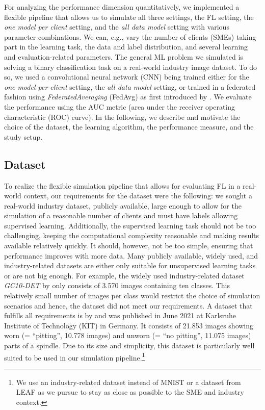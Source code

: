 For analyzing the performance dimension quantitatively, we implemented a flexible pipeline that allows us to simulate all three settings, the FL setting, the \emph{one model per client} setting, and the \emph{all data model} setting with various parameter combinations. We can, e.g., vary the number of clients (SMEs) taking part in the learning task, the data and label distribution, and several learning and evaluation-related parameters. The general ML problem we simulated is solving a binary classification task on a real-world industry image dataset. To do so, we used a convolutional neural network (CNN) being trained either for the \emph{one model per client} setting, the \emph{all data model} setting, or trained in a federated fashion using \emph{FederatedAveraging} (FedAvg) as first introduced by \citet{mcmahan2017communication}. We evaluate the performance using the AUC metric (area under the receiver operating characteristic (ROC) curve). In the following, we describe and motivate the choice of the dataset, the learning algorithm, the performance measure, and the study setup.

\subsection{Dataset\label{sec:methodology_dataset}} To realize the flexible simulation pipeline that allows for evaluating FL in a real-world context, our requirements for the dataset were the following: we sought a real-world industry dataset, publicly available, large enough to allow for the simulation of a reasonable number of clients and must have labels allowing supervised learning. Additionally, the supervised learning task should not be too challenging, keeping the computational complexity reasonable and making results available relatively quickly. It should, however, not be too simple, ensuring that performance improves with more data. Many publicly available, widely used, and industry-related datasets are either only suitable for unsupervised learning tasks or are not big enough. For example, the widely used industry-related dataset \emph{GC10-DET} by \citet{lv2020deep} only consists of 3.570 images containing ten classes. This relatively small number of images per class would restrict the choice of simulation scenarios and hence, the dataset did not meet our requirements. A dataset that fulfills all requirements is by \citet{schlagenhauf2021industrial} and was published in June 2021 at Karlsruhe Institute of Technology (KIT) in Germany. It consists of 21.853 images showing worn (= ``pitting'',  10.778 images) and unworn (= ``no pitting'', 11.075 images) parts of a spindle. Due to its size and simplicity, this dataset is particularly well suited to be used in our simulation pipeline.\footnote{We use an industry-related dataset instead of MNIST \cite{lecun2010mnist} or a dataset from LEAF \citep{caldas2018leaf} as we pursue to stay as close as possible to the SME and industry context.}

